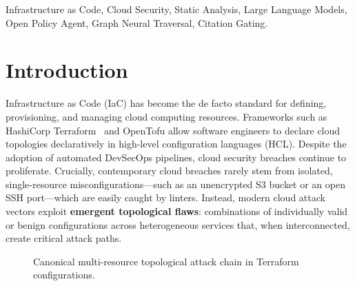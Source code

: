\documentclass[conference]{IEEEtran}
\begin{document}
\begin{IEEEkeywords}
Infrastructure as Code, Cloud Security, Static Analysis, Large Language Models, Open Policy Agent, Graph Neural Traversal, Citation Gating.
\end{IEEEkeywords}

\section{Introduction}

Infrastructure as Code (IaC) has become the de facto standard for defining, provisioning, and managing cloud computing resources. Frameworks such as HashiCorp Terraform~\cite{hashicorp_terraform} and OpenTofu allow software engineers to declare cloud topologies declaratively in high-level configuration languages (HCL). Despite the adoption of automated DevSecOps pipelines, cloud security breaches continue to proliferate. Crucially, contemporary cloud breaches rarely stem from isolated, single-resource misconfigurations---such as an unencrypted S3 bucket or an open SSH port---which are easily caught by linters. Instead, modern cloud attack vectors exploit \textbf{emergent topological flaws}: combinations of individually valid or benign configurations across heterogeneous services that, when interconnected, create critical attack paths.

\begin{figure}[htbp]
\centering
{}
\caption{Canonical multi-resource topological attack chain in Terraform configurations.}
\label{fig:attack_chain}
\end{figure}
\end{document}

